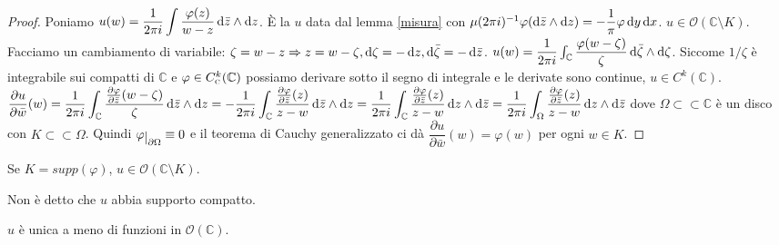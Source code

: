 \begin{proof}
  Poniamo $\displaystyle u(w)=\dfrac{1}{2\pi i}\int \dfrac{\varphi(z)}{w-z} \mathop{}\!\mathrm{d}\bar{z}\wedge\mathop{}\!\mathrm{d} z$. È la $u$ data dal lemma \ref{misura} con $\mu(2\pi i)^{-1}\varphi(\mathop{}\!\mathrm{d}\bar{z}\wedge\mathop{}\!\mathrm{d} z)=-\dfrac{1}{\pi}\varphi\mathop{}\!\mathrm{d} y\mathop{}\!\mathrm{d} x$.
  $u \in \mathcal{O}(\mathbb{C}\setminus K)$. Facciamo un cambiamento di variabile: $\zeta=w-z \Rightarrow z=w-\zeta, \mathop{}\!\mathrm{d}\zeta=-\mathop{}\!\mathrm{d} z, \mathop{}\!\mathrm{d}\bar{\zeta}=-\mathop{}\!\mathrm{d}\bar{z}$.
  $u(w)=\dfrac{1}{2\pi i} \int_{\mathbb{C}} \dfrac{\varphi(w-\zeta)}{\zeta}\mathop{}\!\mathrm{d}\bar{\zeta}\wedge\mathop{}\!\mathrm{d}\zeta$. Siccome $1/\zeta$ è integrabile sui compatti di $\mathbb{C}$ e $\varphi \in C^k_{\text{\textsc{c}}}(\mathbb{C})$ possiamo derivare sotto il segno di integrale e le derivate sono continue, $u \in C^k(\mathbb{C})$.
  $\displaystyle \dfrac{\partial u}{\partial \bar{w}}(w)=\dfrac{1}{2\pi i}\int_{\mathbb{C}} \dfrac{\frac{\partial \varphi}{\partial \bar{z}}(w-\zeta)}{\zeta} \diff \bar{z}\wedge\diff z=-\dfrac{1}{2\pi i}\int_{\mathbb{C}} \dfrac{\frac{\partial\varphi}{\partial\bar{z}}(z)}{z-w}\diff\bar{z}\wedge\diff z=\dfrac{1}{2\pi i}\int_{\mathbb{C}} \dfrac{\frac{\partial\varphi}{\partial\bar{z}}(z)}{z-w}\diff z\wedge\diff\bar{z}=\dfrac{1}{2\pi i}\int_{\Omega} \dfrac{\frac{\partial\varphi}{\partial\bar{z}}(z)}{z-w}\diff z\wedge\diff\bar{z}$ dove $\Omega \subset \subset \mathbb{C}$ è un disco con $K \subset\subset \Omega$.
  Quindi $\varphi\restrict{\partial \Omega}\equiv 0$ e il teorema di Cauchy generalizzato ci dà $\dfrac{\partial u}{\partial\bar{w}}(w)=\varphi(w)$ per ogni $w \in K$.
\end{proof}

\begin{oss}
  Se $K=supp(\varphi)$, $u \in \mathcal{O}(\mathbb{C} \setminus K)$.
\end{oss}

\begin{oss}
  Non è detto che $u$ abbia supporto compatto.
\end{oss}

\begin{oss}
  $u$ è unica a meno di funzioni in $\mathcal{O}(\mathbb{C})$.
\end{oss}
